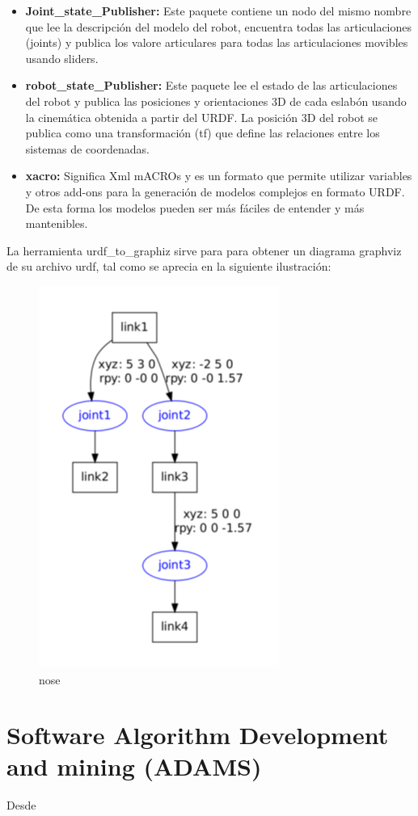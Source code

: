         \begin{itemize}
            \item \textbf{Joint\_state\_Publisher:} Este paquete contiene un nodo del mismo nombre que lee la descripción del modelo del robot, encuentra todas las articulaciones (joints) y publica los valore articulares para todas las articulaciones movibles usando sliders.
            \item \textbf{robot\_state\_Publisher:} Este paquete lee el estado de las articulaciones del robot y publica las posiciones y orientaciones 3D de cada eslabón usando la cinemática obtenida a partir del URDF. La posición 3D del robot se publica como una transformación (tf) que define las relaciones entre los sistemas de coordenadas.
            \item \textbf{xacro:} Significa Xml mACROs y es un formato que permite utilizar variables y otros add-ons para la generación de modelos complejos en formato URDF. De esta forma los modelos pueden ser más fáciles de entender y más mantenibles.
        \end{itemize}      
        
        La herramienta urdf\_to\_graphiz sirve para para obtener un diagrama graphviz de su archivo urdf, tal como se aprecia en la siguiente ilustración:
        
        \begin{figure}[htb]
            \centering
            \includegraphics[width=0.35\linewidth]{Main/Chapter3/Images3/3-9/Esquema-de-los-componentes-de-un-fichero-urdf.png}
            \caption{nose}
            \label{f:Cap3-9_nose_nose}
        \end{figure} 
        
    \newpage

\section{Software Algorithm Development and mining (ADAMS)}
Desde

    
      
        
            
            
            

        
    
    